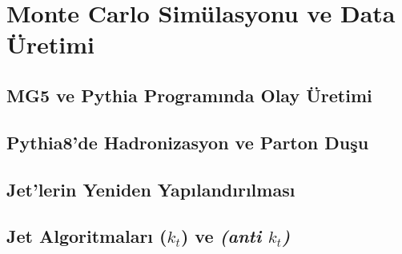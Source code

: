 \section{Monte Carlo Simülasyonu ve Data Üretimi}
\subsection{MG5 ve Pythia Programında Olay Üretimi}
\newpage
\subsection{Pythia8'de Hadronizasyon ve Parton Duşu}
\newpage
\subsection{Jet'lerin Yeniden Yapılandırılması}
\newpage
\subsection{Jet Algoritmaları ($k_t$) ve \textsl{(anti $k_t$)}  }